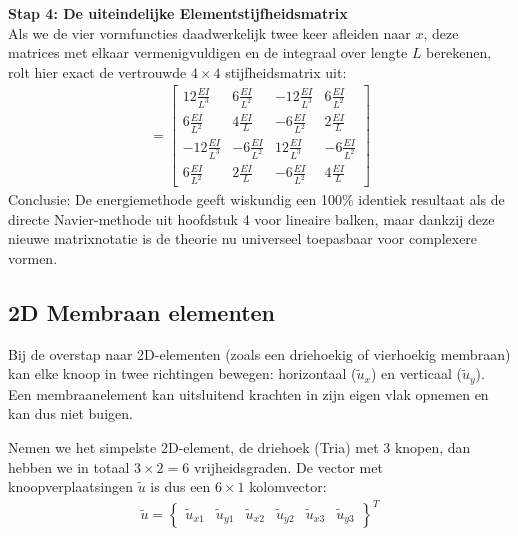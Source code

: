 \documentclass[a4paper,11pt,twoside]{report}
\begin{document}
\textbf{Stap 4: De uiteindelijke Elementstijfheidsmatrix} \\
Als we de vier vormfuncties daadwerkelijk twee keer afleiden naar $x$, deze matrices met elkaar
vermenigvuldigen en de integraal over lengte $L$ berekenen, rolt hier exact de vertrouwde
$4 \times 4$ stijfheidsmatrix uit:
\begin{align*}
    [k_e] =
    \begin{bmatrix}
        12\frac{EI}{L^3}  & 6\frac{EI}{L^2}  & -12\frac{EI}{L^3} & 6\frac{EI}{L^2}  \\
        6\frac{EI}{L^2}   & 4\frac{EI}{L}    & -6\frac{EI}{L^2}  & 2\frac{EI}{L}    \\
        -12\frac{EI}{L^3} & -6\frac{EI}{L^2} & 12\frac{EI}{L^3}  & -6\frac{EI}{L^2} \\
        6\frac{EI}{L^2}   & 2\frac{EI}{L}    & -6\frac{EI}{L^2}  & 4\frac{EI}{L}
    \end{bmatrix}
\end{align*}
Conclusie: De energiemethode geeft wiskundig een 100\% identiek resultaat als de directe
Navier-methode uit hoofdstuk 4 voor lineaire balken, maar dankzij deze nieuwe matrixnotatie is de
theorie nu universeel toepasbaar voor complexere vormen.
\subsection{2D Membraan elementen}
Bij de overstap naar 2D-elementen (zoals een driehoekig of vierhoekig membraan) kan elke knoop in
twee richtingen bewegen: horizontaal ($\tilde{u}_x$) en verticaal ($\tilde{u}_y$). Een
membraanelement kan uitsluitend krachten in zijn eigen vlak opnemen en kan dus niet buigen.

Nemen we het simpelste 2D-element, de driehoek (Tria) met 3 knopen, dan hebben we in totaal
$3 \times 2 = 6$ vrijheidsgraden. De vector met knoopverplaatsingen $\tilde{u}$ is dus een
$6 \times 1$ kolomvector:
\begin{align*}
    \tilde{u} = \begin{Bmatrix} \tilde{u}_{x1} & \tilde{u}_{y1} & \tilde{u}_{x2} & \tilde{u}_{y2} & \tilde{u}_{x3} & \tilde{u}_{y3} \end{Bmatrix}^T
\end{align*}
\end{document}
